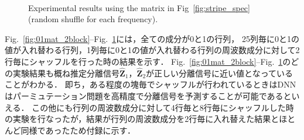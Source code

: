 \begin{figure}[!t]
  \centering
  \\
  \caption{Experimental results using the matrix in Fig~\ref{fig:stripe_spec} (random shuffle for each frequency).}
  \label{fig:stripe_2block}
\end{figure}

Fig.~\ref{fig:01mat_2block}--Fig.~\ref{fig:stripe_2block}には，全ての成分が0と1の行列，
25列毎に0と1の値が入れ替わる行列，1列毎に0と1の値が入れ替わる行列の周波数成分に対して2行毎にシャッフルを行った時の結果を示す．
Fig.~\ref{fig:01mat_2block}--Fig.~\ref{fig:stripe_2block}のどの実験結果も概ね推定分離信号$\hat{\bm{Z}}_1$，$\hat{\bm{Z}}_2$が正しい分離信号に近い値となっていることがわかる．
即ち，ある程度の塊毎でシャッフルが行われているときはDNNはパーミュテーション問題を高精度で分離信号を予測することが可能であるといえる．
この他にも行列の周波数成分に対して4行毎と8行毎にシャッフルした時の実験を行なったが，結果が行列の周波数成分を2行毎に入れ替えた結果とほとんど同様であったため付録に示す．
\clearpage




